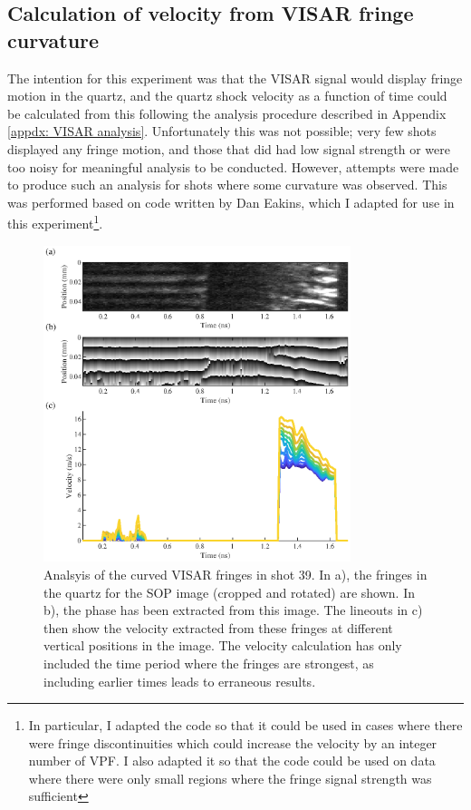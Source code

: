 \subsection{Calculation of velocity from VISAR fringe curvature}

The intention for this experiment was that the VISAR signal would display fringe motion in the quartz, and the quartz shock velocity as a function of time could be calculated from this following the analysis procedure described in Appendix \ref{appdx: VISAR analysis}. Unfortunately this was not possible; very few shots displayed any fringe motion, and those that did had low signal strength or were too noisy for meaningful analysis to be conducted. However, attempts were made to produce such an analysis for shots where some curvature was observed. This was performed based on code written by Dan Eakins, which I adapted for use in this experiment\footnote{In particular, I adapted the code so that it could be used in cases where there were fringe discontinuities which could increase the velocity by an integer number of VPF. I also adapted it so that the code could be used on data where there were only small regions where the fringe signal strength was sufficient}.

\begin{figure} [h]
\begin{centering}
\includegraphics[width=0.8\textwidth]{figures/Experiment/VISARdata.eps}%
\caption{\label{fig:VISAR curvature analysis} Analsyis of the curved VISAR fringes in shot 39. In a), the fringes in the quartz for the SOP image (cropped and rotated) are shown. In b), the phase has been extracted from this image. The lineouts in c) then show the velocity extracted from these fringes at different vertical positions in the image. The velocity calculation has only included the time period where the fringes are strongest, as including earlier times leads to erraneous results.}
\end{centering}
\end{figure}

